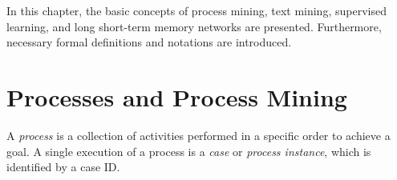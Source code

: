 In this chapter, the basic concepts of process mining, text mining, supervised learning, and long short-term memory networks are presented.
Furthermore, necessary formal definitions and notations are introduced.

\section{Processes and Process Mining}

\begin{definition}[Process]
	A \textit{process} is a collection of activities performed in a specific order to achieve a goal.
	A single execution of a process is a \textit{case} or \textit{process instance}, which is identified by a case ID.
\end{definition}

